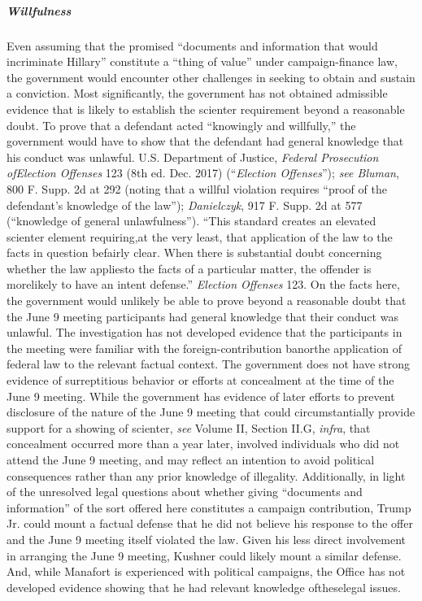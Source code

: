 \subparagraph{Willfulness}
Even assuming that the promised ``documents and information that would incriminate Hillary'' constitute a ``thing of value'' under campaign-finance law, the government would encounter other challenges in seeking to obtain and sustain a conviction. 
Most significantly, the government has not obtained admissible evidence that is likely to establish the scienter requirement beyond a reasonable doubt. 
To prove that a defendant acted ``knowingly and willfully,'' the government would have to show that the defendant had general knowledge that his conduct was unlawful. 
U.S. Department of Justice, \textit{Federal Prosecution ofElection Offenses} 123 (8th ed. Dec. 2017) (``\textit{Election Offenses}''); \textit{see Bluman}, 800 F. Supp. 2d at 292 (noting that a willful violation requires ``proof of the defendant's knowledge of the law''); \textit{Danielczyk}, 917 F. Supp. 2d at 577 (``knowledge of general unlawfulness''). 
``This standard creates an elevated scienter element requiring,at the very least, that application of the law to the facts in question befairly clear. 
When there is substantial doubt concerning whether the law appliesto the facts of a particular matter, the offender is morelikely to have an intent defense.''
\textit{Election Offenses} 123. 
On the facts here, the government would unlikely be able to prove beyond a reasonable doubt that the June 9 meeting participants had general knowledge that their conduct was unlawful. 
The investigation has not developed evidence that the participants in the meeting were familiar with the foreign-contribution banorthe application of federal law to the relevant factual context. 
The government does not have strong evidence of surreptitious behavior or efforts at concealment at the time of the June 9 meeting. 
While the government has evidence of later efforts to prevent disclosure of the nature of the June 9 meeting that could circumstantially provide support for a showing of scienter, \textit{see} Volume II, Section II.G, \textit{infra}, that concealment occurred more than a year later, involved individuals who did not attend the June 9 meeting, and may reflect an intention to avoid political consequences rather than any prior knowledge of illegality. 
Additionally, in light of the unresolved legal questions about whether giving ``documents and information'' of the sort offered here constitutes a campaign contribution, Trump Jr. could mount a factual defense that he did not believe his response to the offer and the June 9 meeting itself violated the law. 
Given his less direct involvement in arranging the June 9 meeting, Kushner could likely mount a similar defense. 
And, while Manafort is experienced with political campaigns, the Office has not developed evidence showing that he had relevant knowledge oftheselegal issues.

